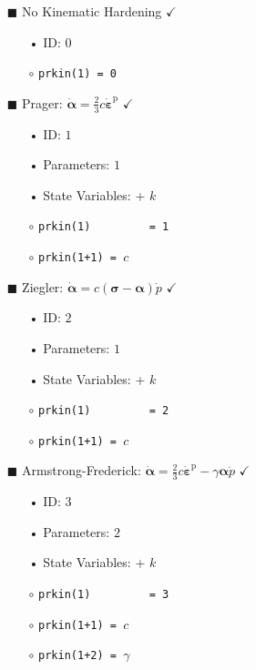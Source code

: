 \documentclass[11pt,a4paper,twoside,final,onecolumn,titlepage]{article}
\newcommand{\verified}{\hspace{0.5pt} {\LARGE $\checkmark$}}
\begin{document}
\begin{itemize}
	\item[\tiny$\blacksquare$] No Kinematic Hardening \verified{}
	\begin{itemize}
		\item[•] ID: $0$\\
		\item[$\circ$] \texttt{prkin(1) = 0}
	\end{itemize}
\end{itemize}

\begin{itemize}
	\item[\tiny$\blacksquare$] Prager: $\displaystyle \dot{\bm{\alpha}}=\frac{2}{3}c\dot{\bm{\varepsilon}}^\textrm{p}$ \verified{}
	\begin{itemize}
		\item[•] ID: $1$
		\item[•] Parameters: $1$
		\item[•] State Variables: + $k$\\
		\item[$\circ$] \texttt{prkin(1)\,\,\,\,\,\,\,\,\,= 1}
		\item[$\circ$] \texttt{prkin(1+1) = $c$}\\
	\end{itemize}
\end{itemize}

\pagebreak
\begin{itemize}
	\item[\tiny$\blacksquare$] Ziegler: $\displaystyle \dot{\bm{\alpha}}=c\left(\bm{\sigma}-\bm{\alpha}\right)\dot{p}$ \verified{}
	\begin{itemize}
		\item[•] ID: $2$
		\item[•] Parameters: $1$
		\item[•] State Variables: + $k$\\
		\item[$\circ$] \texttt{prkin(1)\,\,\,\,\,\,\,\,\,= 2}
		\item[$\circ$] \texttt{prkin(1+1) = $c$}\\
	\end{itemize}
\end{itemize}

\begin{itemize}
	\item[\tiny$\blacksquare$] Armstrong-Frederick: $\displaystyle \dot{\bm{\alpha}}=\frac{2}{3}c\dot{\bm{\varepsilon}}^\textrm{p} -\gamma\bm{\alpha}\dot{p}$ \verified{}
	\begin{itemize}
		\item[•] ID: $3$
		\item[•] Parameters: $2$
		\item[•] State Variables: + $k$\\
		\item[$\circ$] \texttt{prkin(1)\,\,\,\,\,\,\,\,\,= 3}
		\item[$\circ$] \texttt{prkin(1+1) = $c$}
		\item[$\circ$] \texttt{prkin(1+2) = $\gamma$}\\
	\end{itemize}
\end{itemize}
\end{document}
